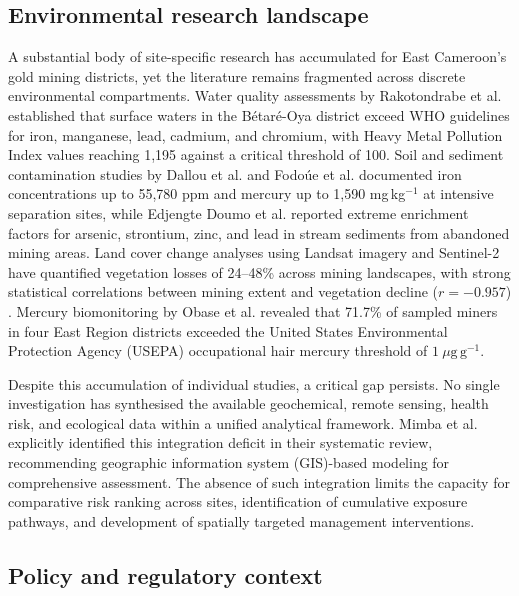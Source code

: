 \documentclass[preprint,12pt,number]{elsarticle}
\begin{document}
\subsection{Environmental research landscape}

A substantial body of site-specific research has accumulated for East Cameroon's gold mining districts, yet the literature remains fragmented across discrete environmental compartments. Water quality assessments by Rakotondrabe et al. \cite{Rakotondrabe2017, Rakotondrabe2018} established that surface waters in the B\'{e}tar\'{e}-Oya district exceed WHO guidelines for iron, manganese, lead, cadmium, and chromium, with Heavy Metal Pollution Index values reaching 1,195 against a critical threshold of 100. Soil and sediment contamination studies by Dallou et al. \cite{Dallou2018} and Fodo\'{u}e et al. \cite{Fodoue2022} documented iron concentrations up to 55,780 ppm and mercury up to 1,590 mg\,kg$^{-1}$ at intensive separation sites, while Edjengte Doumo et al. \cite{Edjengte2023} reported extreme enrichment factors for arsenic, strontium, zinc, and lead in stream sediments from abandoned mining areas. Land cover change analyses using Landsat imagery \cite{Kamga2020} and Sentinel-2 \cite{Azinwi2024, Zoum2025} have quantified vegetation losses of 24--48\% across mining landscapes, with strong statistical correlations between mining extent and vegetation decline ($r = -0.957$) \cite{Zoum2025}. Mercury biomonitoring by Obase et al. \cite{Obase2023} revealed that 71.7\% of sampled miners in four East Region districts exceeded the United States Environmental Protection Agency (USEPA) occupational hair mercury threshold of $1~\mu\text{g}\,\text{g}^{-1}$.

Despite this accumulation of individual studies, a critical gap persists. No single investigation has synthesised the available geochemical, remote sensing, health risk, and ecological data within a unified analytical framework. Mimba et al. \cite{Mimba2023} explicitly identified this integration deficit in their systematic review, recommending geographic information system (GIS)-based modeling for comprehensive assessment. The absence of such integration limits the capacity for comparative risk ranking across sites, identification of cumulative exposure pathways, and development of spatially targeted management interventions.

\subsection{Policy and regulatory context}
\end{document}
